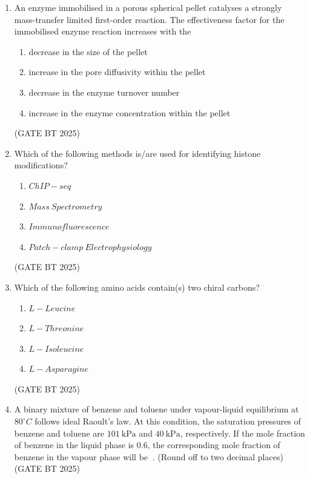 \documentclass[journal,12pt,onecolumn]{IEEEtran}
\theoremstyle{remark}
\begin{document}
\begin{enumerate}
\item An enzyme immobilised in a porous spherical pellet catalyses a strongly mass-transfer limited first-order reaction. The effectiveness factor for the immobilised enzyme reaction increases with the

\begin{enumerate}
    \item decrease in the size of the pellet
    \item increase in the pore diffusivity within the pellet
    \item decrease in the enzyme turnover number
    \item increase in the enzyme concentration within the pellet
\end{enumerate}
\hfill (GATE BT 2025)

\item Which of the following methods is/are used for identifying histone modifications?

\begin{enumerate}
    \item $ChIP\!-\!seq$
    \item $Mass\ Spectrometry$
    \item $Immunofluorescence$
    \item $Patch\!-\!clamp\ Electrophysiology$
\end{enumerate}
\hfill (GATE BT 2025)

\item Which of the following amino acids contain(s) two chiral carbons?
\begin{multicols}{2}
\begin{enumerate}
    \item $L\!-\!Leucine$
    \item $L\!-\!Threonine$
    \item $L\!-\!Isoleucine$
    \item $L\!-\!Asparagine$
\end{enumerate}
\end{multicols}
\hfill (GATE BT 2025)

\item A binary mixture of benzene and toluene under vapour-liquid equilibrium at $80^\circ C$ follows ideal Raoult's law. At this condition, the saturation pressures of benzene and toluene are $101\ \text{kPa}$ and $40\ \text{kPa}$, respectively. If the mole fraction of benzene in the liquid phase is $0.6$, the corresponding mole fraction of benzene in the vapour phase will be $~$. (Round off to two decimal places)
\hfill (GATE BT 2025)


\end{enumerate}
\end{document}
